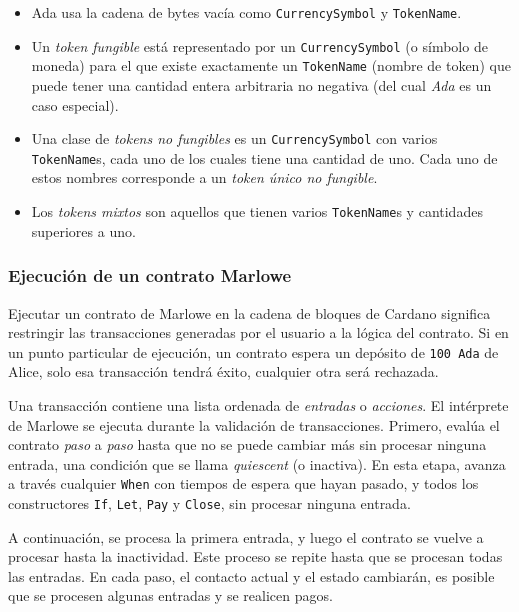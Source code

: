\documentclass[12pt]{book}
\begin{document}
\begin{itemize}
    \item Ada usa la cadena de bytes vacía como \texttt{CurrencySymbol} y \texttt{TokenName}.

    \item Un \textit{token fungible} está representado por un \texttt{CurrencySymbol} (o símbolo de moneda) para el que existe exactamente un \texttt{TokenName} (nombre de token) que puede tener una cantidad entera arbitraria no negativa (del cual \textit{Ada} es un caso especial).

    \item Una clase de \textit{tokens no fungibles} es un \texttt{CurrencySymbol} con varios \texttt{TokenName}s, cada uno de los cuales tiene una cantidad de uno. Cada uno de estos nombres corresponde a un \textit{token único no fungible}.

    \item Los \textit{tokens mixtos} son aquellos que tienen varios \texttt{TokenName}s y cantidades superiores a uno.

\end{itemize}

\subsubsection{Ejecución de un contrato Marlowe}
Ejecutar un contrato de Marlowe en la cadena de bloques de Cardano significa restringir las transacciones generadas por el usuario a la lógica del contrato. Si en un punto particular de ejecución, un contrato espera un depósito de \texttt{100 Ada} de Alice, solo esa transacción tendrá éxito, cualquier otra será rechazada.

Una transacción contiene una lista ordenada de \textit{entradas} o \textit{acciones}. El intérprete de Marlowe se ejecuta durante la validación de transacciones. Primero, evalúa el contrato \textit{paso} a \textit{paso} hasta que no se puede cambiar más sin procesar ninguna entrada, una condición que se llama \textit{quiescent} (o inactiva). En esta etapa, avanza a través cualquier \texttt{When} con tiempos de espera que hayan pasado, y todos los constructores \texttt{If}, \texttt{Let}, \texttt{Pay} y \texttt{Close}, sin procesar ninguna entrada.

A continuación, se procesa la primera entrada, y luego el contrato se vuelve a procesar hasta la inactividad. Este proceso se repite hasta que se procesan todas las entradas. En cada paso, el contacto actual y el estado cambiarán, es posible que se procesen algunas entradas y se realicen pagos.
\end{document}
